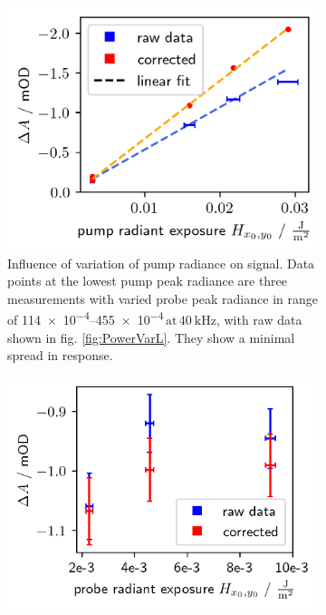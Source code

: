 \documentclass[twoside,openright]{scrreprt}
\def\frep#1{\ensuremath{\,\mathrm{at}\, \SI{#1}{\kilo\hertz}}}
\begin{document}
{\begin{figure}[hbtp]
\begin{subfigure}[t]{0.5\linewidth}
\centering
\includegraphics[width=\linewidth]{images/PowerVariationCorrectedPump.png}
\caption{Influence of variation of pump radiance on signal. Data points at the lowest pump peak radiance are three measurements with varied probe peak radiance in range of \SIrange{114e-4}{455e-4}{\radExp}\frep{40}, with raw data shown in fig. \ref{fig:PowerVarL}. They show a minimal spread in response.}
\end{subfigure}\hfill
\begin{subfigure}[t]{0.5\linewidth}
\centering
\includegraphics[width=\linewidth]{images/PowerVariationCorrectedProbe.png}

\end{subfigure}
\end{figure}}
\end{document}
